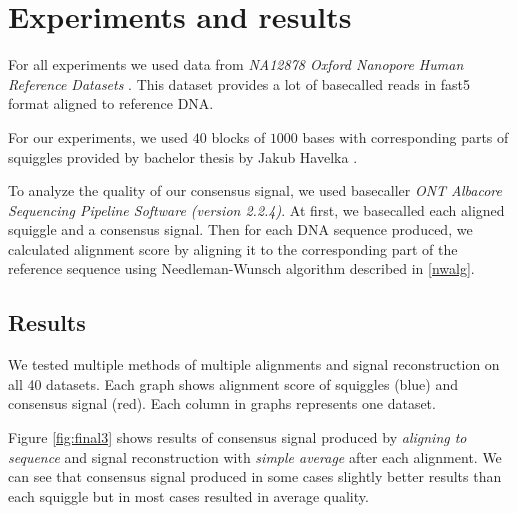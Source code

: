 \chapter{Experiments and results}

\label{kap:experiments} %

For all experiments we used data from \textit{NA12878 Oxford Nanopore Human Reference Datasets} \cite{data}. 
This dataset provides a lot of basecalled reads in fast5 format aligned to reference DNA. 

For our experiments, we used $40$ blocks of $1000$ bases with corresponding parts of squiggles provided by 
bachelor thesis by Jakub Havelka \cite{kubo}.

To analyze the quality of our consensus signal, we used basecaller \textit{ONT Albacore Sequencing Pipeline Software (version 2.2.4)}.
At first, we basecalled each aligned squiggle and a consensus signal. 
Then for each DNA sequence produced, we calculated alignment
score by aligning it to the corresponding part of the reference sequence 
using Needleman-Wunsch algorithm described in \ref{nwalg}.

\section{Results}
We tested multiple methods of multiple alignments and signal reconstruction on all 40 datasets.
Each graph shows alignment score of squiggles (blue) and consensus signal (red).
Each column in graphs represents one dataset.

Figure \ref{fig:final3} shows results of consensus signal produced by \textit{aligning to sequence} and 
signal reconstruction with \textit{simple average} after each alignment. We can see that consensus signal produced in some cases slightly better results than each squiggle but in most cases resulted in average quality.


